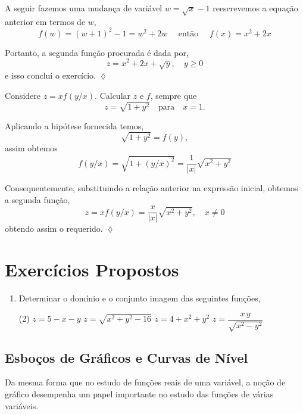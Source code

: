 A seguir fazemos uma mudança de variável $w=\sqrt{x}-1$ reescrevemos a equação anterior em termos de $w$,
\begin{equation*}
	f(w)=(w+1)^2-1=w^2+2w \quad \text{ então }\quad f(x)=x^2+2x
\end{equation*}

Portanto, a segunda função procurada é dada por,
\begin{equation*}
	z=x^2+2x+\sqrt{y}, \quad y \geq 0
\end{equation*}
e isso concluí o exercício. \hfill \(\lozenge\)

\begin{exer}\label{exe:1-6}
	Considere $z=xf(y/x)$. Calcular $z$ e $f$, sempre que 
	\begin{equation*}
		z=\sqrt{1+y^2}\quad  \textrm{para}  \quad x=1.
	\end{equation*}
\end{exer}

\solo Aplicando a hipótese fornecida temos,
\begin{equation*}
	\sqrt{1+y^2}=f(y),
\end{equation*}
assim obtemos
\begin{equation*}
	f(y/x)=\sqrt{1+(y/x)^2}=\frac{1}{|x|}\sqrt{x^2+y^2}
\end{equation*}

Consequentemente, substituindo a relação anterior na expressão inicial, obtemos a segunda função,
\begin{equation*}
	z=xf(y/x)=\frac{x}{|x|}\sqrt{x^2+y^2}, \quad x \neq 0
\end{equation*}
obtendo assim o requerido. \hfill \(\lozenge\)

%
\section*{\textcolor[rgb]{0.98,0.00,0.00}{Exercícios Propostos}}
%
\begin{enumerate}
	\item Determinar o domínio e o conjunto imagem das seguintes funções,
	\begin{tasks}[](2)
		\task[(a)] \; \(z=5-x-y\)
		\task[(b)] \; \(z=\sqrt{x^{2}+y^{2}-16}\)
		\task[(c)] \;\(z=4+x^{2}+y^{2}\)
		\task[(d)] \; \(z=\dfrac{x\,y}{\sqrt{x^{2}-y^{2}}}\)
	\end{tasks}
\end{enumerate}

%
\subsection{\textcolor[rgb]{0.98,0.00,0.00}{Esboços de Gráficos e Curvas de Nível}}
%
Da mesma forma que no estudo de funções reais de uma variável, a noção de gráfico desempenha um papel importante no estudo das funções de várias variáveis.

